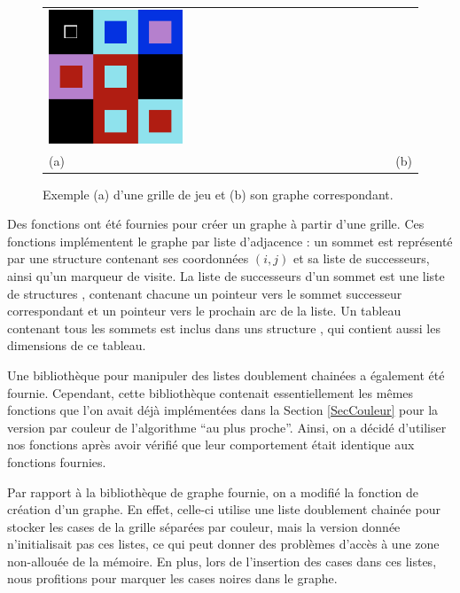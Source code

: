 \documentclass[a4paper,12pt]{article}
\numberwithin{equation}{section}
\begin{document}
\begin{figure}
\centering
\begin{tabular}{@{} >{\centering} m{} @{} >{\centering} m{} @{}}
\includegraphics[width=0.4\textwidth]{3_3_4_0} &  \tabularnewline
(a) & (b) \tabularnewline
\end{tabular}
\caption{Exemple (a) d'une grille de jeu et (b) son graphe correspondant.}
\label{FigGrilleGraphe}
\end{figure}

Des fonctions ont été fournies pour créer un graphe à partir d'une grille. Ces fonctions implémentent le graphe par liste d'adjacence : un sommet est représenté par une structure \verb@Sommet@ contenant ses coordonnées $(i, j)$ et sa liste de successeurs, ainsi qu'un marqueur de visite. La liste de successeurs d'un sommet est une liste de structures \verb@Arc@, contenant chacune un pointeur vers le sommet successeur correspondant et un pointeur vers le prochain arc de la liste. Un tableau contenant tous les sommets est inclus dans uns structure \verb@Graphe@, qui contient aussi les dimensions de ce tableau.

Une bibliothèque pour manipuler des listes doublement chainées a également été fournie. Cependant, cette bibliothèque contenait essentiellement les mêmes fonctions que l'on avait déjà implémentées dans la Section \ref{SecCouleur} pour la version par couleur de l'algorithme ``au plus proche''. Ainsi, on a décidé d'utiliser nos fonctions après avoir vérifié que leur comportement était identique aux fonctions fournies.

Par rapport à la bibliothèque de graphe fournie, on a modifié la fonction de création d'un graphe. En effet, celle-ci utilise une liste doublement chainée pour stocker les cases de la grille séparées par couleur, mais la version donnée n'initialisait pas ces listes, ce qui peut donner des problèmes d'accès à une zone non-allouée de la mémoire. En plus, lors de l'insertion des cases dans ces listes, nous profitions pour marquer les cases noires dans le graphe.
\end{document}
